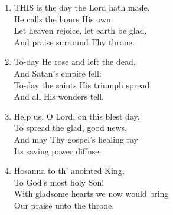 \begin{enumerate}
    \item THIS is the day the Lord hath made, \\
        He calls the hours His own. \\
        Let heaven rejoice, let earth be glad, \\
        And praise surround Thy throne.

    \item To-day He rose and left the dead, \\
        And Satan's empire fell; \\
        To-day the saints His triumph spread, \\
        And all His wonders tell.

    \item Help us, O Lord, on this blest day, \\
        To spread the glad, good news, \\
        And may Thy gospel's healing ray \\
        Its saving power diffuse.

    \item Hosanna to th' anointed King, \\
        To God's most holy Son! \\
        With gladsome hearts we now would bring \\
        Our praise unto the throne.

\end{enumerate}

